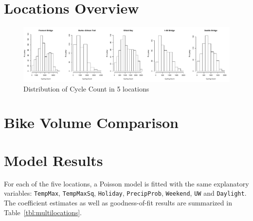 \documentclass [11pt, proquest] {uwthesis}[2015/03/03]
\begin{document}
\section{Locations Overview}

\begin{figure}
  \includegraphics[width=1\textwidth]{figures/5sites/distribution5} 
 \caption{Distribution of Cycle Count in 5 locations }
 \label{fig:distribution5}
\end{figure}

\section{Bike Volume Comparison}

\section{Model Results}
For each of the five locations, a Poisson model is fitted with the same explanatory variables:
\texttt{TempMax}, \texttt{TempMaxSq}, \texttt{Holiday}, \texttt{PrecipProb}, \texttt{Weekend}, \texttt{UW} and \texttt{Daylight}. The coefficient estimates as well as goodness-of-fit results are summarized in Table~\ref{tbl:multilocations}.
\end{document}
